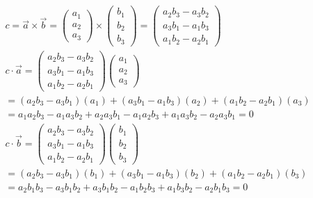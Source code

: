 \documentclass[a4paper]{article}
\begin{document}
  \subsection{}
    \begin{align*}
      c = \vec{a} \times \vec{b}
      =
      \begin{pmatrix}
      a_1 \\ a_2 \\ a_3
      \end{pmatrix}
      \times
      \begin{pmatrix}
      b_1 \\ b_2 \\ b_3
      \end{pmatrix}
      =
      \begin{pmatrix}
      a_2 b_3 - a_3 b_2 \\ a_3 b_1 - a_1 b_3 \\ a_1 b_2 - a_2 b_1
      \end{pmatrix}
      \\[1em]
      c \cdot \vec{a}
      =
      \begin{pmatrix}
      a_2 b_3 - a_3 b_2 \\ a_3 b_1 - a_1 b_3 \\ a_1 b_2 - a_2 b_1
      \end{pmatrix}
      \begin{pmatrix}
      a_1 \\ a_2 \\ a_3
      \end{pmatrix}
      \\[1em]
      = (a_2 b_3 - a_3 b_1) (a_1) + (a_3 b_1 - a_1 b_3) (a_2) + (a_1 b_2 - a_2 b_1) (a_3)
      \\[1em]
      = a_1 a_2 b_3 - a_1 a_3 b_2 + a_2 a_3 b_1 - a_1 a_2 b_3 + a_1 a_3 b_2 - a_2 a_3 b_1
      = 0
      \\[1em]
      c \cdot \vec{b}
      =
      \begin{pmatrix}
      a_2 b_3 - a_3 b_2 \\ a_3 b_1 - a_1 b_3 \\ a_1 b_2 - a_2 b_1
      \end{pmatrix}
      \begin{pmatrix}
      b_1 \\ b_2 \\ b_3
      \end{pmatrix}
      \\[1em]
      = (a_2 b_3 - a_3 b_1) (b_1) + (a_3 b_1 - a_1 b_3) (b_2) + (a_1 b_2 - a_2 b_1) (b_3)
      \\[1em]
      = a_2 b_1 b_3 - a_3 b_1 b_2 + a_3 b_1 b_2 - a_1 b_2 b_3 + a_1 b_3 b_2 - a_2 b_1 b_3
      = 0
    \end{align*}
\end{document}

